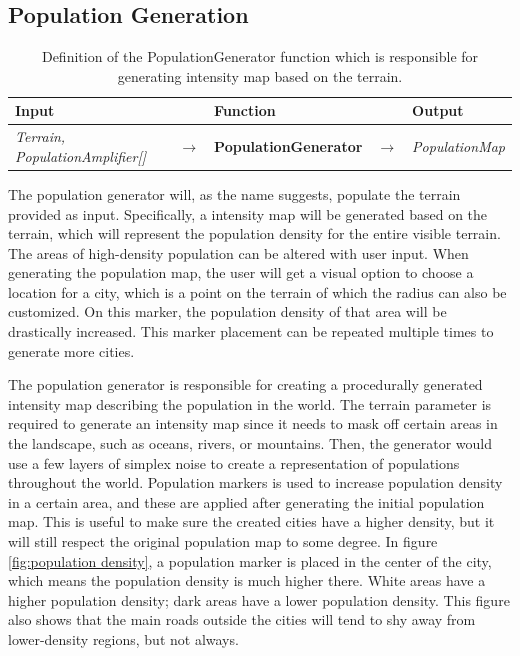 \subsection{Population Generation}

\begin{table}[H]
  \centering
  \begin{tabular}{lllll}
    \textbf{Input}                           &               & \textbf{Function}            &               & \textbf{Output}         \\
    \midrule
    \textit{Terrain, PopulationAmplifier[]}      & $\rightarrow$ & \textbf{PopulationGenerator}      & $\rightarrow$ & \textit{PopulationMap}        \\
    \bottomrule
  \end{tabular}

  \caption{Definition of the PopulationGenerator function which is responsible for generating intensity map based on the terrain.}
  \label{table:popgen}
\end{table}
\vspace{-0.4cm} %

The population generator will, as the name suggests, populate the terrain provided as input. Specifically, a intensity map will be generated based on the terrain, which will represent the population density for the entire visible terrain.
The areas of high-density population can be altered with user input.
When generating the population map, the user will get a visual option to choose a location for a city, which is a point on the terrain of which the radius can also be customized.
On this marker, the population density of that area will be drastically increased.
This marker placement can be repeated multiple times to generate more cities.

The population generator is responsible for creating a procedurally generated intensity map describing the population in the world.
The terrain parameter is required to generate an intensity map since it needs to mask off certain areas in the landscape, such as oceans, rivers, or mountains.
Then, the generator would use a few layers of simplex noise to create a representation of populations throughout the world.
Population markers is used to increase population density in a certain area, and these are applied after generating the initial population map.
This is useful to make sure the created cities have a higher density, but it will still respect the original population map to some degree.
In figure \ref{fig:population density}, a population marker is placed in the center of the city, which means the population density is much higher there.
White areas have a higher population density; dark areas have a lower population density. This figure also shows that the main roads outside the cities will tend to shy away from lower-density regions, but not always.


